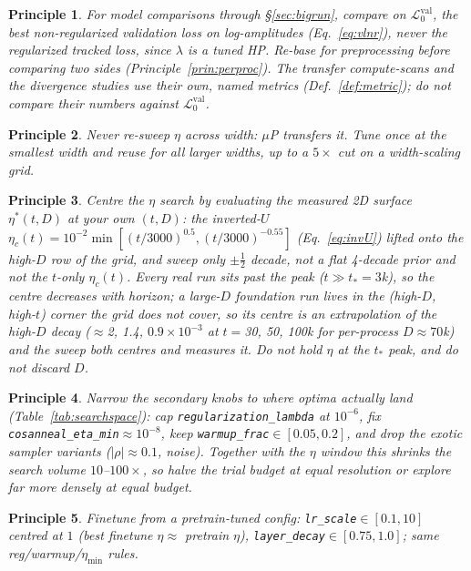 \documentclass[11pt]{article}
\newcommand{\abs}[1]{\left\lvert #1 \right\rvert}
\newcommand{\vlnr}{\mathcal{L}^{\mathrm{val}}_{0}}   %
\newcommand{\tstar}{t_\ast}
\newcommand{\code}[1]{\texttt{#1}}
\newtheorem{principle}{Principle}
\begin{document}
\begin{principle} For model comparisons through \S\ref{sec:bigrun}, compare on $\vlnr$, the
best \emph{non-regularized} validation loss on
log-amplitudes (Eq.~\ref{eq:vlnr}), never the regularized tracked loss, since $\lambda$ is a
tuned HP. Re-base for preprocessing before comparing two sides (Principle~\ref{prin:perproc}).
The transfer compute-scans and the divergence studies use their own, named metrics
(Def.~\ref{def:metric}); do
not compare their numbers against $\vlnr$.
\end{principle}
\begin{principle} Never re-sweep $\eta$ across width: $\mu$P transfers it. Tune once at the
smallest width and reuse for all larger widths, up to a $5\times$ cut on a width-scaling grid.
\end{principle}
\begin{principle} Centre the $\eta$ search by evaluating the measured 2D surface
$\eta^\ast(t,D)$ at your \emph{own} $(t,D)$: the inverted-$U$ $\eta_c(t)=10^{-2}\min[(t/3000)^{0.5},(t/3000)^{-0.55}]$
(Eq.~\ref{eq:invU}) lifted onto the high-$D$ row of the grid, and sweep only $\pm\tfrac12$
decade, not a flat 4-decade prior and not the $t$-only $\eta_c(t)$. Every real run sits past the
peak ($t\gg\tstar=3$k), so the centre \emph{decreases} with horizon; a large-$D$ foundation run
lives in the (high-$D$, high-$t$) corner the grid does not cover, so its centre is an
extrapolation of the high-$D$ decay ($\approx$2, 1.4, $0.9\times10^{-3}$ at $t=$30, 50, 100k for
per-process $D\!\approx\!70$k) and the sweep both centres and measures it. Do not hold $\eta$ at
the $\tstar$ peak, and do not discard $D$.
\end{principle}
\begin{principle} Narrow the secondary knobs to where optima actually land
(Table~\ref{tab:searchspace}): cap \code{regularization\_lambda} at $10^{-6}$, fix
\code{cosanneal\_eta\_min}$\approx10^{-8}$, keep \code{warmup\_frac}$\in[0.05,0.2]$, and drop the
exotic sampler variants ($\abs\rho\approx0.1$, noise). Together with the $\eta$ window this
shrinks the search volume $10$--$100\times$, so halve the trial budget at equal resolution or
explore far more densely at equal budget.
\end{principle}
\begin{principle} Finetune from a pretrain-tuned config: \code{lr\_scale}$\in[0.1,10]$ centred at
$1$ (best finetune $\eta\approx$ pretrain $\eta$), \code{layer\_decay}$\in[0.75,1.0]$; same
reg/warmup/$\eta_{\min}$ rules.
\end{principle}
\end{document}
